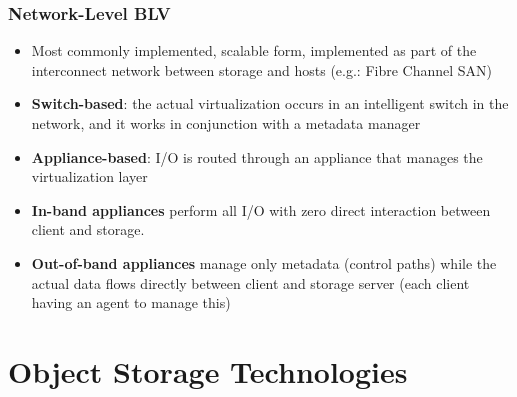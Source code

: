 \documentclass{article}
\begin{document}
\subsubsection{Network-Level BLV}
\begin{itemize}
    \item Most commonly implemented, scalable form, implemented as part of the interconnect network between storage and hosts (e.g.: Fibre Channel SAN)
    
    \item \textbf{Switch-based}: the actual virtualization occurs in an intelligent switch in the network, and it works in conjunction with a metadata manager
    
    \item \textbf{Appliance-based}: I/O is routed through an appliance that manages the virtualization layer
    
    \item \textbf{In-band appliances} perform all I/O with zero direct interaction between client and storage. 
    
    \item \textbf{Out-of-band appliances} manage only metadata (control paths) while the actual data flows directly between client and storage server (each client having an agent to manage this)
\end{itemize}

\section{Object Storage Technologies}
\end{document}
